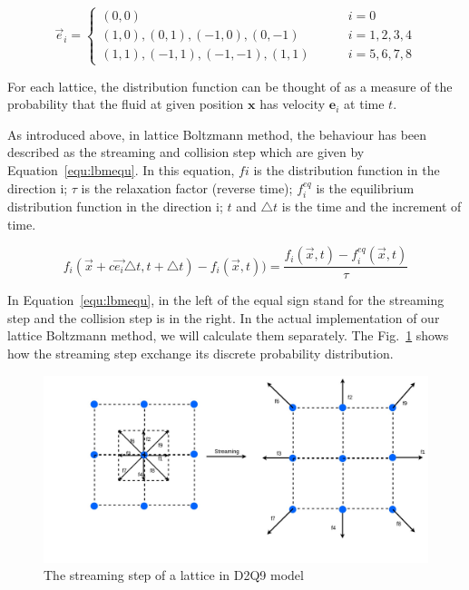 \begin{equation}
\label{equ:d2q9}
    \vec{e}_{i} = \left\{\begin{matrix}
(0,0) \qquad\qquad\qquad\qquad\qquad\qquad &i=0 \\ 
(1,0), (0,1), (-1,0), (0,-1)\quad\qquad &i=1,2,3,4 \\ 
(1,1), (-1,1), (-1,-1), (1,1)\qquad & i=5,6,7,8
\end{matrix}\right.
\end{equation}

For each lattice, the distribution function can be thought of as a measure of the probability that the fluid at given position $\mathbf{x}$ has velocity $\mathbf{e}_i$ at time $t$.

As introduced above, in lattice Boltzmann method, the behaviour has been described as the streaming and collision step which are given by Equation~\ref{equ:lbmequ}. In this equation, $fi$ is the distribution function in the direction i; $\tau$ is the relaxation factor (reverse time); $f_i^{eq}$ is the equilibrium distribution function in the direction i; $t$ and $\triangle t$ is the time and the increment of time.

\begin{equation}
\label{equ:lbmequ}
f_i(\vec{x}+c\vec{e_i}\triangle t, t+\triangle t) - f_i(\vec x,t)) = \frac{f_i(\vec x, t) - f_i^{eq}(\vec x , t)}{\tau}
\end{equation}




In Equation~\ref{equ:lbmequ}, in the left of the equal sign stand for the streaming step and the collision step is in the right. In the actual implementation of our lattice Boltzmann method, we will calculate them separately. The Fig.~\ref{fig:stream} shows how the streaming step exchange its discrete probability distribution.


\begin{figure}[!tb]
   \centering
       \includegraphics[width=1\textwidth]{figures/stream.jpg}
       \caption{The streaming step of a lattice in D2Q9 model}
       \label{fig:stream}
\end{figure}

